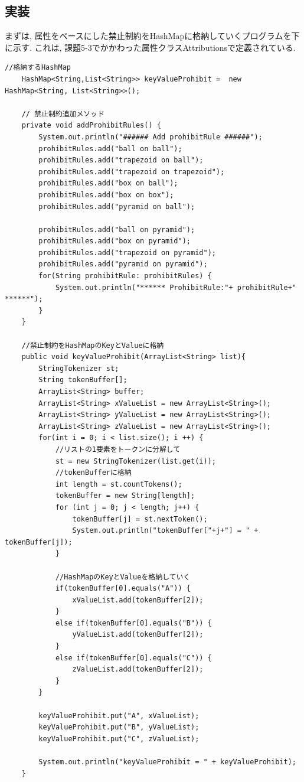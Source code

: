 \documentclass[uplatex,12pt]{jsarticle}
\begin{document}
\subsection{実装}
まずは, 属性をベースにした禁止制約をHashMapに格納していくプログラムを下に示す. これは, 課題5-3でかかわった属性クラスAttributionsで定義されている.
\begin{lstlisting}[caption=禁止制約をHashMapに管理, label=src:No1]
	//格納するHashMap
	HashMap<String,List<String>> keyValueProhibit =  new HashMap<String, List<String>>();

	// 禁止制約追加メソッド
	private void addProhibitRules() {
		System.out.println("###### Add prohibitRule ######");
		prohibitRules.add("ball on ball");
		prohibitRules.add("trapezoid on ball");
		prohibitRules.add("trapezoid on trapezoid");
		prohibitRules.add("box on ball");
		prohibitRules.add("box on box");
		prohibitRules.add("pyramid on ball");

		prohibitRules.add("ball on pyramid");
		prohibitRules.add("box on pyramid");
		prohibitRules.add("trapezoid on pyramid");
		prohibitRules.add("pyramid on pyramid");
		for(String prohibitRule: prohibitRules) {
			System.out.println("****** ProhibitRule:"+ prohibitRule+" ******");
		}
	}

	//禁止制約をHashMapのKeyとValueに格納
	public void keyValueProhibit(ArrayList<String> list){
		StringTokenizer st;
		String tokenBuffer[];
		ArrayList<String> buffer;
		ArrayList<String> xValueList = new ArrayList<String>();
		ArrayList<String> yValueList = new ArrayList<String>();
		ArrayList<String> zValueList = new ArrayList<String>();
		for(int i = 0; i < list.size(); i ++) {
			//リストの1要素をトークンに分解して
			st = new StringTokenizer(list.get(i));
			//tokenBufferに格納
			int length = st.countTokens();
			tokenBuffer = new String[length];
			for (int j = 0; j < length; j++) {
				tokenBuffer[j] = st.nextToken();
				System.out.println("tokenBuffer["+j+"] = " + tokenBuffer[j]);
			}

			//HashMapのKeyとValueを格納していく
			if(tokenBuffer[0].equals("A")) {
				xValueList.add(tokenBuffer[2]);
			}
			else if(tokenBuffer[0].equals("B")) {
				yValueList.add(tokenBuffer[2]);
			}
			else if(tokenBuffer[0].equals("C")) {
				zValueList.add(tokenBuffer[2]);
			}
		}

		keyValueProhibit.put("A", xValueList);
		keyValueProhibit.put("B", yValueList);
		keyValueProhibit.put("C", zValueList);

		System.out.println("keyValueProhibit = " + keyValueProhibit);
	}
\end{lstlisting}
\end{document}
